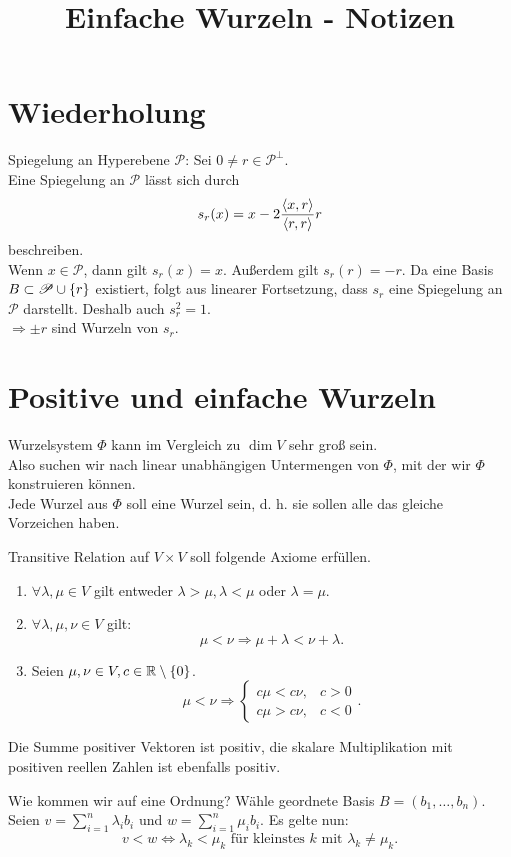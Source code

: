 \documentclass{article}
\begin{document}
\title{Einfache Wurzeln - Notizen}

\section{Wiederholung}

Spiegelung an Hyperebene \( \mathscr{P} \):
Sei \( 0 \neq r \in \mathscr{P}^\bot \).\\
Eine Spiegelung an \( \mathscr{P} \) lässt sich 
durch 
\[ s_r(x) = x - 2\frac{\langle x, r \rangle}{\langle r, r \rangle} r \]
beschreiben.\\
Wenn \( x \in \mathscr{P} \), dann gilt 
\( s_r(x) = x \). Außerdem gilt \( s_r(r) = -r \).
Da eine Basis \( B \subset \mathscr{P} \cup \{r\} \) 
existiert, folgt aus linearer Fortsetzung, dass 
\( s_r \) eine Spiegelung an \( \mathscr{P} \) 
darstellt.
Deshalb auch \( s_r^2 = 1 \). \\
\( \Rightarrow \pm r \) sind Wurzeln von \( s_r \).


\section{Positive und einfache Wurzeln}

Wurzelsystem \( \Phi \) kann im Vergleich zu 
\( \dim V \) sehr groß sein.\\
Also suchen wir nach linear unabhängigen Untermengen 
von \( \Phi \), mit der wir \( \Phi \) konstruieren 
können.\\
Jede Wurzel aus \( \Phi \) soll eine  
Wurzel sein, d. h. sie sollen alle das gleiche Vorzeichen 
haben.

\begin{defi} %
    Transitive Relation auf \( V \times V \) soll 
    folgende Axiome erfüllen.
    \begin{enumerate}
        \item \( \forall \lambda, \mu \in V \) gilt 
        entweder \( \lambda > \mu, \lambda < \mu \) oder 
        \( \lambda = \mu \).
        \item \( \forall \lambda, \mu, \nu \in V \) gilt:
        \[ \mu < \nu \Rightarrow \mu + \lambda < \nu + \lambda. \]
        \item Seien \( \mu, \nu \in V, c \in \mathbb{R} \setminus \{0\} \).
        \[ \mu < \nu \Rightarrow 
        \begin{cases}
            c \mu < c \nu, & c > 0 \\
            c \mu > c \nu, & c < 0
        \end{cases}. \]
    \end{enumerate}
    Die Summe positiver Vektoren ist positiv, die skalare 
    Multiplikation mit positiven reellen Zahlen ist ebenfalls 
    positiv.
\end{defi}
Wie kommen wir auf eine Ordnung?
Wähle geordnete Basis \( B = (b_1, \ldots, b_n) \). 
Seien \( v = \sum_{i=1}^n \lambda_i b_i \) und 
\( w = \sum_{i=1}^n \mu_i b_i \).
Es gelte nun:
\[ v < w \Leftrightarrow
\lambda_k < \mu_k \text{ für kleinstes } k \text{ mit } 
\lambda_k \neq \mu_k. \]
\end{document}
